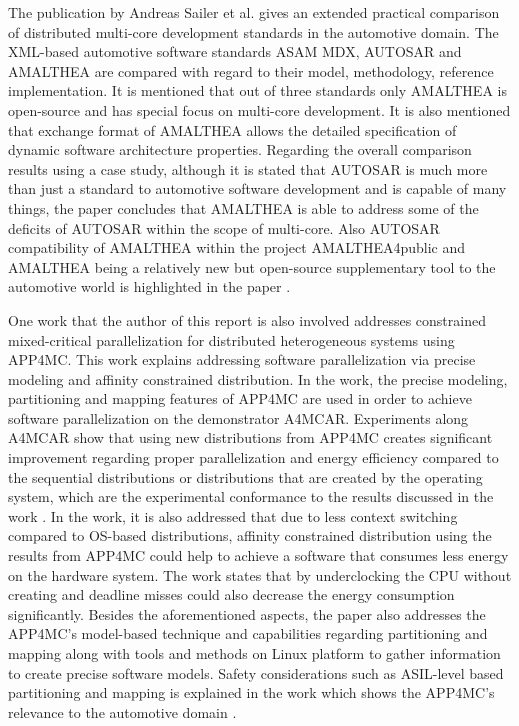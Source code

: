 The publication by Andreas Sailer et al. \cite{comparisonpaperapp4mc} gives an extended practical comparison of distributed multi-core development standards in the automotive domain. The XML-based automotive software standards ASAM MDX, AUTOSAR and AMALTHEA are compared with regard to their model, methodology, reference implementation. It is mentioned that out of three standards only AMALTHEA is open-source and has special focus on multi-core development. It is also mentioned that exchange format of AMALTHEA allows the detailed specification of dynamic software architecture properties. Regarding the overall comparison results using a case study, although it is stated that AUTOSAR is much more than just a standard to automotive software development and is capable of many things, the paper concludes that AMALTHEA is able to address some of the deficits of AUTOSAR within the scope of multi-core. Also AUTOSAR compatibility of AMALTHEA within the project AMALTHEA4public and AMALTHEA being a relatively new but open-source supplementary tool to the automotive world is highlighted in the paper \cite{comparisonpaperapp4mc}.

One work that the author of this report is also involved \cite{constrainedpaper} addresses constrained mixed-critical parallelization for distributed heterogeneous systems using APP4MC. This work explains addressing software parallelization via precise modeling and affinity constrained distribution. In the work, the precise modeling, partitioning and mapping features of APP4MC are used in order to achieve software parallelization on the demonstrator A4MCAR. Experiments along A4MCAR show that using new distributions from APP4MC creates significant improvement regarding proper parallelization and energy efficiency compared to the sequential distributions or distributions that are created by the operating system, which are the experimental conformance to the results discussed in the work \cite{priorpaperapp4mc}. In the work, it is also addressed that due to less context switching compared to OS-based distributions, affinity constrained distribution using the results from APP4MC could help to achieve a software that consumes less energy on the hardware system. The work states that by underclocking the CPU without creating and deadline misses could also decrease the energy consumption significantly. Besides the aforementioned aspects, the paper \cite{constrainedpaper} also addresses the APP4MC's model-based technique and capabilities regarding partitioning and mapping along with tools and methods on Linux platform to gather information to create precise software models. Safety considerations such as ASIL-level based partitioning and mapping is explained in the work which shows the APP4MC's relevance to the automotive domain \cite{constrainedpaper}.

